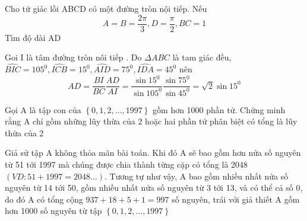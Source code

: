 

\begin{baitap}
Cho tứ giác lồi ABCD có một đường tròn nội tiếp. Nếu $$A = B = \frac{{2\pi }}{3},D = \frac{\pi }{2},BC = 1$$
Tìm độ dài AD



\begin{loigiai1}
Goi I là tâm đường tròn nôi tiếp . Do $\Delta ABC$ là tam giác đều, $\widehat{BIC} = 105^0 ,\widehat{ICB} = 15^0,\widehat{AID} = 75^0,\widehat{IDA} = 45^0$ nên$$ AD = \frac{{BI}}{{BC}}\frac{{AD}}{{AI}} = \frac{{\sin 15^0 }}{{\sin 105^0 }}\frac{{\sin 75^0 }}{{\sin 45^0 }} = \sqrt 2 \sin 15^0  $$
\end{loigiai1}
\end{baitap}


\begin{baitap}
Gọi A là tập con của $\left\{ {0,1,2,...,1997} \right\}$ gồm hơn 1000 phần tử. Chứng minh rằng A chỉ gồm những lũy thừa của 2 hoặc hai phần tử phân biệt có tổng là lũy thừa của 2



\begin{loigiai1}
\noindent
Giả  sử tập A không thỏa mãn bài toán. Khi đó A sẽ bao gồm hơn nửa số nguyên từ 51 tới 1997 mà chúng được chia thành từng cặp có tổng là 2048 $\left( {VD:51 + 1997 = 2048...} \right)$. Tương tự như vậy, A bao gồm nhiều nhất nửa số nguyên từ 14  tới 50, gồm nhiều nhất nửa số nguyên từ 3 tới 13, và có thể cả số 0, do đó A có tổng cộng  $937+18+5+1=997$ số nguyên, trái với giả thiết A gồm hơn 1000 số nguyên từ tập $\left\{ {0,1,2,...,1997} \right\}$
\end{loigiai1}
\end{baitap}

